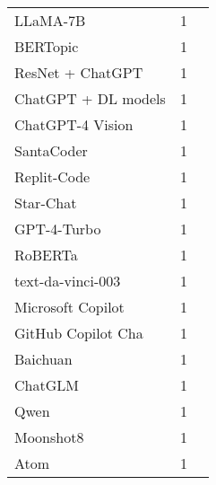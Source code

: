 \begin{table}[ht]
\begin{tabular}{l c p{4cm}}
		LLaMA-7B & 1 \\
		BERTopic & 1 \\
		ResNet + ChatGPT & 1 \\
		ChatGPT + DL models & 1 \\
		ChatGPT-4 Vision & 1 \\
		SantaCoder & 1 \\
		Replit-Code & 1 \\
		Star-Chat & 1 \\
		GPT-4-Turbo & 1 \\
		RoBERTa & 1 \\
		text-da-vinci-003 & 1 \\
		Microsoft Copilot & 1 \\
		GitHub Copilot Cha & 1 \\
		Baichuan & 1 \\
		ChatGLM & 1 \\
		Qwen & 1 \\
		Moonshot8 & 1 \\
		Atom & 1 \\

\end{tabular}
\end{table}
